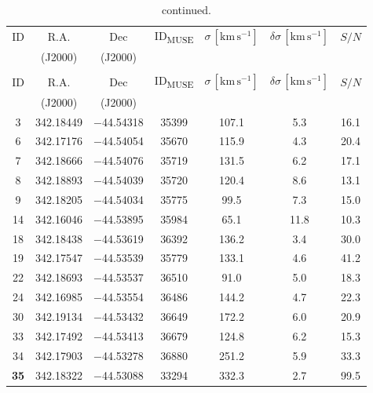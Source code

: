 \documentclass{aa}
\begin{document}
\begin{appendix}
\begin{longtable}{c c c c c c c}
\end{longtable}

\begin{longtable}{c c c c c c c}
\caption{\label{tab:table2248} Velocity dispersion catalogue for AS1063.}\\
\hline\hline
ID & R.A. & Dec & ID\textsubscript{MUSE} & $\sigma \, [\mathrm{km \, s^{-1}}]$ & $\delta \sigma \, [\mathrm{km \, s^{-1}}]$ & $S/N$ \\  & (J2000) & (J2000) & & & & \\
\hline
\endfirsthead
\caption{continued.}\\
\hline\hline
ID & R.A. & Dec & ID\textsubscript{MUSE} & $\sigma \, [\mathrm{km \, s^{-1}}]$ & $\delta \sigma \, [\mathrm{km \, s^{-1}}]$ & $S/N$ \\  & (J2000) & (J2000) & & & & \\
\hline
\endhead
\hline
\endfoot
%
3 & 342.18449 & $-$44.54318 & 35399 & 107.1 & 5.3 & 16.1 \\
6 & 342.17176 & $-$44.54054 & 35670 & 115.9 & 4.3 & 20.4 \\
7 & 342.18666 & $-$44.54076 & 35719 & 131.5 & 6.2 & 17.1 \\
8 & 342.18893 & $-$44.54039 & 35720 & 120.4 & 8.6 & 13.1 \\
9 & 342.18205 & $-$44.54034 & 35775 & 99.5 & 7.3 & 15.0 \\
14 & 342.16046 & $-$44.53895 & 35984 & 65.1 & 11.8 & 10.3 \\
18 & 342.18438 & $-$44.53619 & 36392 & 136.2 & 3.4 & 30.0 \\
19 & 342.17547 & $-$44.53539 & 35779 & 133.1 & 4.6 & 41.2 \\
22 & 342.18693 & $-$44.53537 & 36510 & 91.0 & 5.0 & 18.3 \\
24 & 342.16985 & $-$44.53554 & 36486 & 144.2 & 4.7 & 22.3 \\
30 & 342.19134 & $-$44.53432 & 36649 & 172.2 & 6.0 & 20.9 \\
33 & 342.17492 & $-$44.53413 & 36679 & 124.8 & 6.2 & 15.3 \\
34 & 342.17903 & $-$44.53278 & 36880 & 251.2 & 5.9 & 33.3 \\
\textbf{35} & 342.18322 & $-$44.53088 & 33294 & 332.3 & 2.7 & 99.5 \\

\end{longtable}
\end{appendix}
\end{document}

